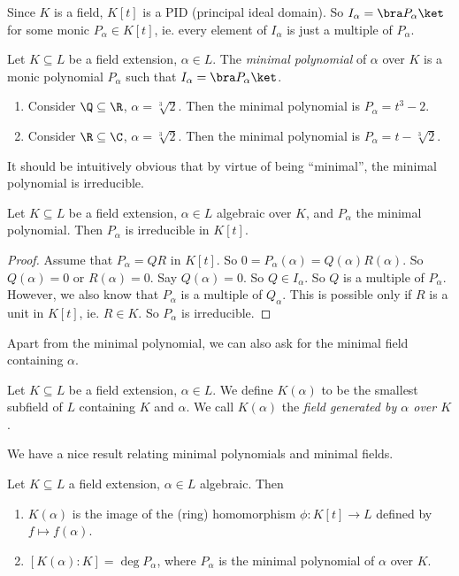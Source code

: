 \documentclass[a4paper]{article}
\begin{document}
Since $K$ is a field, $K[t]$ is a PID (principal ideal domain). So $I_\alpha = \bra P_\alpha\ket$ for some monic $P_\alpha \in K[t]$, ie. every element of $I_\alpha$ is just a multiple of $P_\alpha$.
\begin{defi}
  Let $K\subseteq L$ be a field extension, $\alpha \in L$. The \emph{minimal polynomial} of $\alpha$ over $K$ is a monic polynomial $P_\alpha$ such that $I_\alpha = \bra P_\alpha\ket$.
\end{defi}

\begin{eg}\leavevmode
  \begin{enumerate}
    \item Consider $\Q\subseteq\R$, $\alpha = \sqrt[3]{2}$. Then the minimal polynomial is $P_\alpha = t^3 - 2$.
    \item Consider $\R\subseteq\C$, $\alpha = \sqrt[3]{2}$. Then the minimal polynomial is $P_\alpha = t - \sqrt[3]{2}$.
  \end{enumerate}
\end{eg}

It should be intuitively obvious that by virtue of being ``minimal'', the minimal polynomial is irreducible.
\begin{prop}
  Let $K\subseteq L$ be a field extension, $\alpha\in L$ algebraic over $K$, and $P_\alpha$ the minimal polynomial. Then $P_\alpha$ is irreducible in $K[t]$.
\end{prop}

\begin{proof}
  Assume that $P_\alpha = QR$ in $K[t]$. So $0 = P_\alpha(\alpha) = Q(\alpha) R(\alpha)$. So $Q(\alpha) = 0$ or $R(\alpha) = 0$. Say $Q(\alpha) = 0$. So $Q\in I_\alpha$. So $Q$ is a multiple of $P_\alpha$. However, we also know that $P_\alpha$ is a multiple of $Q_\alpha$. This is possible only if $R$ is a unit in $K[t]$, ie. $R\in K$. So $P_\alpha$ is irreducible.
\end{proof}

Apart from the minimal polynomial, we can also ask for the minimal field containing $\alpha$.
\begin{defi}
  Let $K\subseteq L$ be a field extension, $\alpha\in L$. We define $K(\alpha)$ to be the smallest subfield of $L$ containing $K$ and $\alpha$. We call $K(\alpha)$ the \emph{field generated by $\alpha$ over $K$}.
\end{defi}

We have a nice result relating minimal polynomials and minimal fields.
\begin{thm}
  Let $K\subseteq L$ a field extension, $\alpha\in L$ algebraic. Then
  \begin{enumerate}
    \item $K(\alpha)$ is the image of the (ring) homomorphism $\phi: K[t] \to L$ defined by $f \mapsto f(\alpha)$.
    \item $[K(\alpha): K] = \deg P_\alpha$, where $P_\alpha$ is the minimal polynomial of $\alpha$ over $K$.
  \end{enumerate}
\end{thm}
\end{document}
